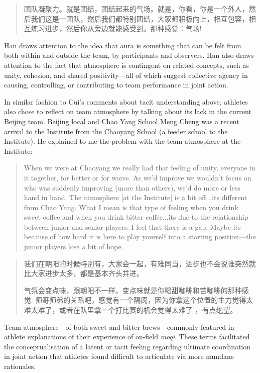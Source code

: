 \begin{CJK}{UTF8}{gbsn}
    \begin{quote}
      团队凝聚力。就是团结，团结起来的气场。就是，你看，你是一个外人，然后我们这是一团队，然后我们都特别团结，大家都积极向上，相互包容，相互练习进步，然后你从旁边就能感受到。那种感觉：气场!
    \end{quote}

Han draws attention to the idea that aura is something that can be felt from both within and outside the team, by participants and observers.  Han also draws attention to the fact that atmosphere is contingent on related concepts, such as unity, cohesion, and shared positivity---all of which suggest collective agency in causing, controlling, or contributing to team performance in joint action.

In similar fashion to Cui's comments about tacit understanding above, athletes also chose to reflect on team atmosphere by talking about its lack in the current Beijing team.  Beijing local and Chao Yang School Meng Cheng was a recent arrival to the Institute from the Chaoyang School (a feeder school to the Institute).  He explained to me the problem with the team atmosphere at the Institute:

    \begin{quote}
      When we were at Chaoyang we really had that feeling of unity, everyone in it together, for better or for worse.  As we'd improve we wouldn't focus on who was suddenly improving (more than others), we'd do more or less hand in hand.  The atmosphere [at the Institute] is a bit off...its different from Chao Yang.  What I mean is that type of feeling when you drink sweet coffee and when you drink bitter coffee...its due to the relationship between junior and senior players: I feel that there is a gap.  Maybe its because of how hard it is here to play yourself into a starting position---the junior players lose a bit of hope.
    \end{quote}

    \begin{quote}
      我们在朝阳的时候特别有，大家会一起，有难同当，进步也不会说谁突然就比大家进步太多，都是基本齐头并进。

      气氛会变点味，跟朝阳不一样。变点味就是你喝甜咖啡和苦咖啡的那种感觉. 师哥师弟的关系吧，感觉有一个隔阂，因为你拿这个位置的主力觉得太难太难了，或者在队里拿一个打比赛的机会觉得太难了 ，有点绝望。
    \end{quote}

Team atmosphere---of both sweet and bitter brews---commonly featured in athlete explanations of their experience of on-field \textit{moqi}.  These terms facilitated the conceptualisation of a latent or tacit feeling regarding ultimate coordination in joint action that athletes found difficult to articulate via more mundane rationales.


\end{CJK}
